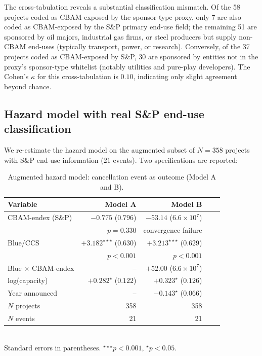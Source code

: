 \documentclass[11pt,a4paper]{article}
\begin{document}
The cross-tabulation reveals a substantial classification mismatch. Of the 58 projects coded as CBAM-exposed by the sponsor-type proxy, only 7 are also coded as CBAM-exposed by the S\&P primary end-use field; the remaining 51 are sponsored by oil majors, industrial gas firms, or steel producers but supply non-CBAM end-uses (typically transport, power, or research). Conversely, of the 37 projects coded as CBAM-exposed by S\&P, 30 are sponsored by entities not in the proxy's sponsor-type whitelist (notably utilities and pure-play developers). The Cohen's $\kappa$ for this cross-tabulation is $0.10$, indicating only slight agreement beyond chance.

\subsection{Hazard model with real S\&P end-use classification}

We re-estimate the hazard model on the augmented subset of $N = 358$ projects with S\&P end-use information ($21$ events). Two specifications are reported:

\begin{table}[ht]
\centering
\caption{Augmented hazard model: cancellation event as outcome (Model A and B).}
\label{tab:app-augmented-hazard}
\begin{tabular}{lrrrr}
\toprule
Variable & Model A & Model B & \\
\midrule
CBAM-endex (S\&P)        & $-0.775$ ($0.796$) & $-53.14$ ($6.6 \times 10^{7}$) \\
                          & $p = 0.330$         & convergence failure \\
Blue/CCS                  & $+3.182^{\star\star\star}$ ($0.630$) & $+3.213^{\star\star\star}$ ($0.629$) \\
                          & $p < 0.001$         & $p < 0.001$ \\
Blue $\times$ CBAM-endex  & --                  & $+52.00$ ($6.6 \times 10^{7}$) \\
log(capacity)             & $+0.282^{\star}$ ($0.122$) & $+0.323^{\star}$ ($0.126$) \\
Year announced            & --                  & $-0.143^{\star}$ ($0.066$) \\
\midrule
$N$ projects              & 358 & 358 \\
$N$ events                & 21 & 21 \\
\bottomrule
\end{tabular}
\\\footnotesize{Standard errors in parentheses. $^{\star\star\star}p<0.001$, $^{\star}p<0.05$.}
\end{table}
\end{document}
